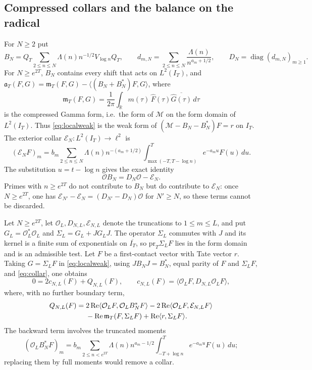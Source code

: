 \documentclass[11pt]{amsart}
\theoremstyle{definition}
\theoremstyle{remark}
\newcommand{\R}{\mathbb R}
\newcommand{\Rel}{\operatorname{Re}}
\newcommand{\IT}{I_T}
\newcommand{\Fh}{\widehat F}
\begin{document}
\subsection{Compressed collars and the balance on the radical}\label{subsec:collars}

For $N\ge2$ put
\[
 B_N=Q_T\sum_{2\le n\le N}\Lambda(n)n^{-1/2}V_{\log n}Q_T,\qquad
 d_{m,N}=\sum_{2\le n\le N}\frac{\Lambda(n)}{n^{a_m+1/2}},\qquad
 D_N=\operatorname{diag}(d_{m,N})_{m\ge1}.
\]
For $N\ge e^{2T}$, $B_N$ contains every shift that acts on $L^2(\IT)$, and
$\mathfrak a_T(F,G)=\mathfrak m_T(F,G)-\langle(B_N+B_N^*)F,G\rangle$, where
\[
 \mathfrak m_T(F,G)=\frac1{2\pi}\int_\R m(\tau)\,\Fh(\tau)\overline{\widehat G(\tau)}\,d\tau
\]
is the compressed Gamma form, i.e.\ the form of $\mathcal M$ on the form domain of $L^2(\IT)$.
Thus \eqref{eq:localweak} is the weak form of $(\mathcal M-B_N-B_N^*)F=r$ on $\IT$.
The exterior collar $\mathcal E_N:L^2(\IT)\to\ell^2$ is
\[
 (\mathcal E_NF)_m=b_m\sum_{2\le n\le N}\Lambda(n)n^{-(a_m+1/2)}
 \int_{\max(-T,T-\log n)}^T e^{-a_mu}F(u)\,du.
\]
The substitution $u=t-\log n$ gives the exact identity
\begin{equation}\label{eq:collar}
 \mathcal OB_N=D_N\mathcal O-\mathcal E_N.
\end{equation}
Primes with $n\ge e^{2T}$ do not contribute to $B_N$ but do contribute to $\mathcal E_N$: once
$N\ge e^{2T}$, one has $\mathcal E_{N'}-\mathcal E_N=(D_{N'}-D_N)\mathcal O$ for $N'\ge N$, so these terms
cannot be discarded.

Let $N\ge e^{2T}$, let $\mathcal O_L,D_{N,L},\mathcal E_{N,L}$ denote the truncations to $1\le m\le L$, and put
$G_L=\mathcal O_L^*\mathcal O_L$ and $\Sigma_L=G_L+JG_LJ$. The operator $\Sigma_L$ commutes with $J$ and its kernel is a finite
sum of exponentials on $\overline{\IT}$, so $\mathrm{pr}_T\Sigma_LF$ lies in the form domain and is an admissible
test. Let $F$ be a first-contact vector with Tate vector $r$. Taking $G=\Sigma_LF$ in
\eqref{eq:localweak}, using $JB_NJ=B_N^*$, equal parity of $F$ and $\Sigma_LF$, and \eqref{eq:collar}, one
obtains
\begin{equation}\label{eq:Qbalance}
 0=2c_{N,L}(F)+Q_{N,L}(F),\qquad
 c_{N,L}(F)=\langle \mathcal O_LF,D_{N,L}\mathcal O_LF\rangle,
\end{equation}
where, with no further boundary term,
\begin{align}\label{eq:Qfull}
 Q_{N,L}(F)={}&2\Rel\langle \mathcal O_LF,\mathcal O_LB_N^*F\rangle
 -2\Rel\langle \mathcal O_LF,\mathcal E_{N,L}F\rangle\notag\\
 &-\Rel\mathfrak m_T(F,\Sigma_LF)+\Rel\langle r,\Sigma_LF\rangle.
\end{align}
The backward term involves the truncated moments
\[
 (\mathcal O_LB_N^*F)_m=b_m\sum_{2\le n<e^{2T}}
 \Lambda(n)n^{a_m-1/2}\int_{-T+\log n}^T e^{-a_mu}F(u)\,du;
\]
replacing them by full moments would remove a collar.
\end{document}

